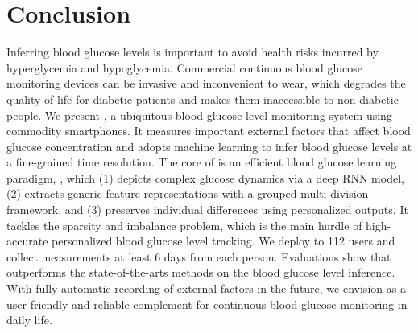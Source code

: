 
\section{Conclusion}
\label{sec:conclusion}
Inferring blood glucose levels is important to avoid health risks incurred by hyperglycemia and hypoglycemia.
Commercial continuous blood glucose monitoring devices can be invasive and inconvenient to wear, which degrades the quality of life for diabetic patients and makes them inaccessible to non-diabetic people.
We present \sysname, a ubiquitous blood glucose level monitoring system using commodity smartphones.
It measures important external factors that affect blood glucose concentration and adopts machine learning to infer blood glucose levels at a fine-grained time resolution.
The core of \sysname is an efficient blood glucose learning paradigm, \modelname, which (1) depicts complex glucose dynamics via a deep RNN model, (2) extracts generic feature representations with a grouped multi-division framework, and (3) preserves individual differences using personalized outputs.
It tackles the sparsity and imbalance problem, which is the main hurdle of high-accurate personalized blood glucose level tracking.
\textcolor[rgb]{1.00,0.00,0.00}{We deploy \sysname to 112 users and collect measurements at least 6 days from each person.}
Evaluations show that \modelname outperforms the state-of-the-arts methods on the blood glucose level inference.
With fully automatic recording of external factors in the future, we envision \sysname as a user-friendly and reliable complement for continuous blood glucose monitoring in daily life.

